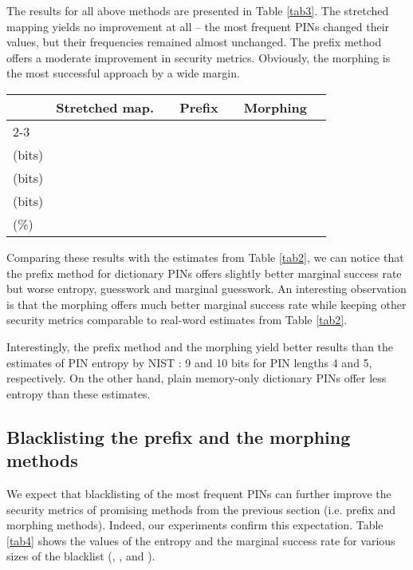\documentclass[a4paper, 11pt]{article}
\newcommand{\ra}[1]{\renewcommand{\arraystretch}{#1}}
\begin{document}
{The results for all above methods are presented in Table \ref{tab3}. The stretched mapping yields no 
improvement at all -- the most frequent PINs changed their values, but their frequencies remained almost
unchanged. The prefix method offers a moderate improvement in security metrics. Obviously, the morphing 
is the most successful approach by a wide margin.

\begin{table*}[h]\centering
\ra{1.2}
\begin{tabular}{@{}lrrrrrrrrr@{}}\toprule
 & \multicolumn{2}{c}{Stretched map.} &\phantom{a} & \multicolumn{2}{c}{Prefix} &\phantom{a} & \multicolumn{2}{c}{Morphing} \\
   \cmidrule{2-3} \cmidrule{5-6} \cmidrule{8-9}
 &  &  &&  &  &&  &  \\ 
\midrule
 (bits) &  &  &&  &  &&  &  \\
  (bits)  &  &  &&  &  &&  &  \\
 (bits) &  &  &&  &  &&  &  \\
 (\%)  &  &  &&  &  &&  &  \\
\bottomrule
\end{tabular}
\caption{Modifications of PIN constructions -- results based on SUBTLEXus}\label{tab3}
\end{table*}

Comparing these results with the estimates from Table \ref{tab2}, we can notice that the prefix method
for dictionary PINs offers slightly better marginal success rate but worse entropy, guesswork and marginal guesswork. 
An interesting observation is that the morphing offers much better marginal success rate while keeping other
security metrics comparable to real-word estimates from Table \ref{tab2}.

Interestingly, the prefix method and the morphing yield better results than the estimates of PIN entropy 
by NIST \cite{NIST}: 9 and 10 bits for PIN lengths 4 and 5, respectively. On the other hand, plain memory-only
dictionary PINs offer less entropy than these estimates.

\subsection{Blacklisting the prefix and the morphing methods}

We expect that blacklisting of the most frequent PINs can further improve the security metrics 
of promising methods from the previous section (i.e. prefix and morphing methods). Indeed, our 
experiments confirm this expectation. Table \ref{tab4} shows the values of the entropy and the
marginal success rate for various sizes of the blacklist (, , and ). 

}
\end{document}
